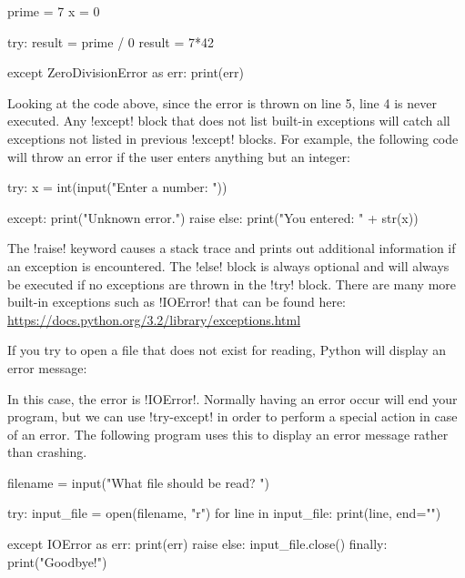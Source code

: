 \documentclass[11pt]{cselabheader}
\begin{document}
\begin{python3code}
prime = 7
x = 0

try:
  result = prime / 0
  result = 7*42

except ZeroDivisionError as err:
  print(err)
\end{python3code}

Looking at the code above, since the error is thrown on line 5, line 4 is never executed.  Any \pythoninline!except!  block that does not list built-in  exceptions will catch all exceptions not listed in previous \pythoninline!except! blocks.  For example, the following code will throw an error if the user enters anything but an integer:

\begin{python3code}
try:
  x = int(input("Enter a number: "))

except:
  print("Unknown error.")
  raise
else:
  print("You entered: " + str(x))
\end{python3code}

The \pythoninline!raise! keyword causes a stack trace and prints out additional information if an exception is encountered.  The \pythoninline!else! block is always optional and will always be executed if no exceptions are thrown in the \pythoninline!try! block.  There are many more built-in exceptions such as \pythoninline!IOError! that can be found here: \url{https://docs.python.org/3.2/library/exceptions.html}

If you try to open a file that does not exist for reading, Python will display
an error message:


In this case, the error is \pythoninline!IOError!. Normally having an
error occur will end your program, but we can use \pythoninline!try-except! in
order to perform a special action in case of an error. The following program
uses this to display an error message rather than crashing.

\begin{python3code}
filename = input("What file should be read? ")

try:
  input_file = open(filename, "r")
  for line in input_file:
    print(line, end="")

except IOError as err:
  print(err)
  raise
else:
  input_file.close()
finally:
  print("Goodbye!")
\end{python3code}
\end{document}
